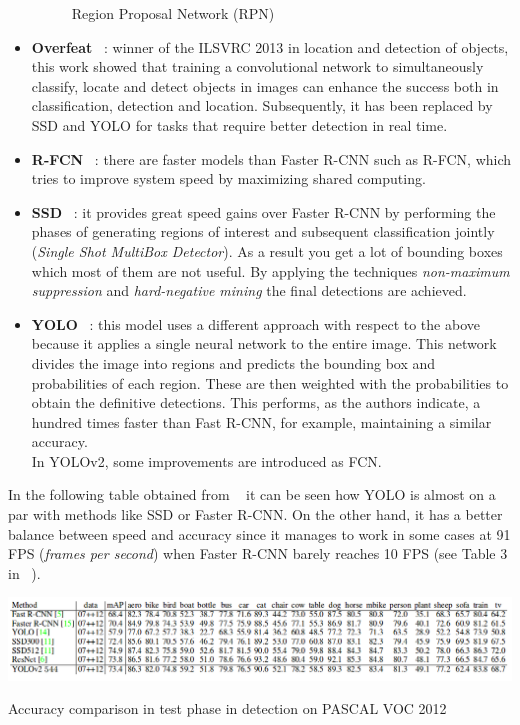 \documentclass{bmvc2k}
\begin{document}
\begin{itemize}
\begin{figure}[h!]
\begin{center}
\caption{Region Proposal Network (RPN)}
\label{fig:fasterrcnn}
\end{center}
\end{figure}
\item \textbf{Overfeat} ~\cite{sermanet2013overfeat}: winner of the ILSVRC 2013 in location and detection of objects, this work showed that training a convolutional network to simultaneously classify, locate and detect objects in images can enhance the success both in classification, detection and location. Subsequently, it has been replaced by SSD and YOLO for tasks that require better detection in real time.
\item \textbf{R-FCN} ~\cite{dai2016r}: there are faster models than Faster R-CNN such as R-FCN, which tries to improve system speed by maximizing shared computing. %
\item \textbf{SSD} ~\cite{liu2016ssd}: it provides great speed gains over Faster R-CNN by performing the phases of generating regions of interest and subsequent classification jointly (\textit{Single Shot MultiBox Detector}). As a result you get a lot of bounding boxes which most of them are not useful. By applying the techniques \textit{non-maximum suppression} and \textit{hard-negative mining} the final detections are achieved.
\item \textbf{YOLO} ~\cite{redmon2016yolo9000}: this model uses a different approach with respect to the above because it applies a single neural network to the entire image. This network divides the image into regions and predicts the bounding box and probabilities of each region. These are then weighted with the probabilities to obtain the definitive detections. This performs, as the authors indicate, a hundred times faster than Fast R-CNN, for example, maintaining a similar accuracy.\\ In YOLOv2, some improvements are introduced as FCN.
\end{itemize}
In the following table obtained from ~\cite{redmon2016yolo9000} it can be seen how YOLO is almost on a par with methods like SSD or Faster R-CNN. On the other hand, it has a better balance between speed and accuracy since it manages to work in some cases at 91 FPS (\textit{frames per second}) when Faster R-CNN barely reaches 10 FPS (see Table 3 in ~\cite{redmon2016yolo9000}).
\begin{table}[h!]
\begin{center}
\includegraphics[scale=0.35]{yolo_results_pascal12.png}
\caption{Accuracy comparison in test phase in detection on PASCAL VOC 2012}
\end{center}
\end{table}
\end{document}
